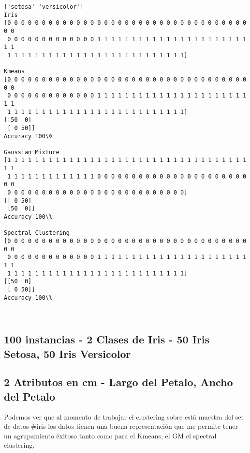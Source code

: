 \documentclass[11pt]{article}
\begin{document}
    \begin{Verbatim}[commandchars=\\\{\}]
['setosa' 'versicolor']
Iris
[0 0 0 0 0 0 0 0 0 0 0 0 0 0 0 0 0 0 0 0 0 0 0 0 0 0 0 0 0 0 0 0 0 0 0 0 0
 0 0 0 0 0 0 0 0 0 0 0 0 0 1 1 1 1 1 1 1 1 1 1 1 1 1 1 1 1 1 1 1 1 1 1 1 1
 1 1 1 1 1 1 1 1 1 1 1 1 1 1 1 1 1 1 1 1 1 1 1 1 1 1]

Kmeans
[0 0 0 0 0 0 0 0 0 0 0 0 0 0 0 0 0 0 0 0 0 0 0 0 0 0 0 0 0 0 0 0 0 0 0 0 0
 0 0 0 0 0 0 0 0 0 0 0 0 0 1 1 1 1 1 1 1 1 1 1 1 1 1 1 1 1 1 1 1 1 1 1 1 1
 1 1 1 1 1 1 1 1 1 1 1 1 1 1 1 1 1 1 1 1 1 1 1 1 1 1]
[[50  0]
 [ 0 50]]
Accuracy 100\%

Gaussian Mixture
[1 1 1 1 1 1 1 1 1 1 1 1 1 1 1 1 1 1 1 1 1 1 1 1 1 1 1 1 1 1 1 1 1 1 1 1 1
 1 1 1 1 1 1 1 1 1 1 1 1 1 0 0 0 0 0 0 0 0 0 0 0 0 0 0 0 0 0 0 0 0 0 0 0 0
 0 0 0 0 0 0 0 0 0 0 0 0 0 0 0 0 0 0 0 0 0 0 0 0 0 0]
[[ 0 50]
 [50  0]]
Accuracy 100\%

Spectral Clustering
[0 0 0 0 0 0 0 0 0 0 0 0 0 0 0 0 0 0 0 0 0 0 0 0 0 0 0 0 0 0 0 0 0 0 0 0 0
 0 0 0 0 0 0 0 0 0 0 0 0 0 1 1 1 1 1 1 1 1 1 1 1 1 1 1 1 1 1 1 1 1 1 1 1 1
 1 1 1 1 1 1 1 1 1 1 1 1 1 1 1 1 1 1 1 1 1 1 1 1 1 1]
[[50  0]
 [ 0 50]]
Accuracy 100\%

    \end{Verbatim}

    \begin{center}
    \end{center}
    { \hspace*{\fill} \\}
    
    \subsection{100 instancias - 2 Clases de Iris - 50 Iris Setosa, 50 Iris
Versicolor}\label{instancias---2-clases-de-iris---50-iris-setosa-50-iris-versicolor}

\subsection{2 Atributos en cm - Largo del Petalo, Ancho del
Petalo}\label{atributos-en-cm---largo-del-petalo-ancho-del-petalo}

Podemos ver que al momento de trabajar el clustering sobre está muestra
del set de datos \#iris los datos tienen una buena representación que me
permite tener un agrupamiento éxitoso tanto como para el Kmeans, el GM
el spectral clustering.
\end{document}
